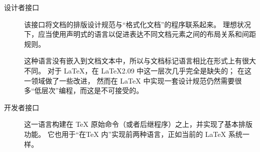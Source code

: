 \documentclass{l3doc}
\begin{document}
\begin{description}
\item[设计者接口] 该接口将文档的排版设计规范与“格式化文档”的程序联系起来。
理想状况下，应当使用声明式的语言以促进表达不同文档元素之间的布局关系和间距规则。

%
这种语言没有嵌入到文档文本中，所以与文档标记语言相比在形式上有很大不同。
对于 \LaTeX{}，在  \LaTeX{}2.09 中这一层次几乎完全是缺失的；
\LaTeXe{} 在这一领域做了一些改进，
然而在 \LaTeX{} 中实现一套设计规范仍然需要很多“低层次”编程，而这是不可接受的。

\item[开发者接口]
这一语言构建在 \TeX{} 原始命令（或者后继程序）之上，并实现了基本排版功能。
它也用于“在\TeX{} 内”实现前两种语言，正如当前的 \LaTeX{} 系统一样。
%
\end{description}

%
\end{document}
